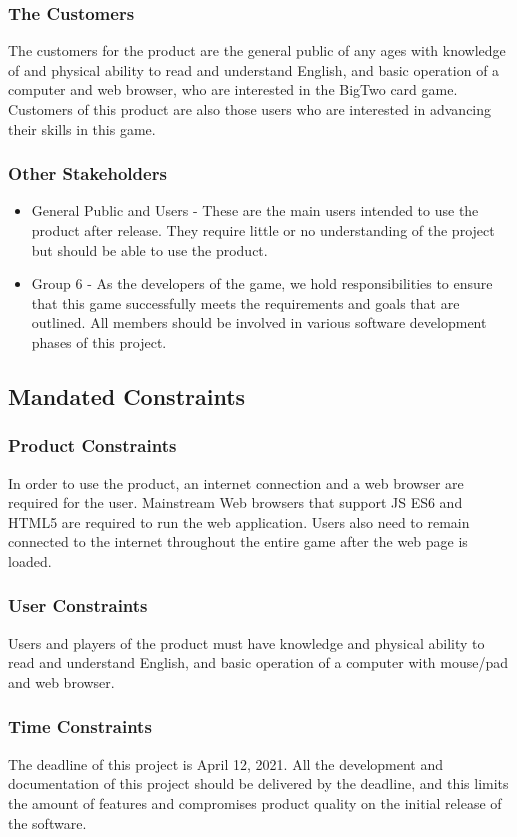 \documentclass[12pt, titlepage]{article}
\begin{document}
\subsubsection{The Customers}
The customers for the product are the general public of any ages with knowledge of and physical ability to read and understand English, and basic operation of a computer and web browser, who are interested in the BigTwo card game. Customers of this product are also those users who are interested in advancing their skills in this game.

\subsubsection{Other Stakeholders}
\begin{itemize}
    \item General Public and Users - These are the main users intended to use the product after release. They require little or no understanding of the project but should be able to use the product.
    \item Group 6 - As the developers of the game, we hold responsibilities to ensure that this game successfully meets the requirements and goals that are outlined. All members should be involved in various software development phases of this project.
\end{itemize}

\subsection{Mandated Constraints}
\subsubsection{Product Constraints}
In order to use the product, an internet connection and a web browser are required for the user. Mainstream Web browsers that support JS ES6 and HTML5 are required to run the web application. Users also need to remain connected to the internet throughout the entire game after the web page is loaded.
\subsubsection{User Constraints}
Users and players of the product must have knowledge and physical ability to read and understand English, and basic operation of a computer with mouse/pad and web browser.
\subsubsection{Time Constraints}
The deadline of this project is April 12, 2021. All the development and documentation of this project should be delivered by the deadline, and this limits the amount of features and compromises product quality on the initial release of the software.
\end{document}
